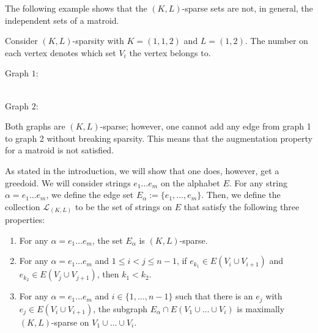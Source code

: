 \documentclass{article}
\begin{document}
The following example shows that the $(K,L)$-sparse sets are not, in general, the independent sets of a matroid. 
\begin{example}
Consider $(K,L)$-sparsity with $K=(1,1,2)$ and $L=(1,2)$. The number on each vertex denotes which set $V_i$ the vertex belongs to.
\begin{center}    
Graph $1$:\\
\\
Graph $2$:\\
\end{center}

Both graphs are $(K,L)$-sparse; however, one cannot add any edge from graph 1 to graph 2 without breaking sparsity. This means that the augmentation property for a matroid is not satisfied.
\end{example}



As stated in the introduction, we will show that one does, however, get a greedoid. We will consider strings $e_1\dots e_m$ on the alphabet $E$. For any string $\alpha=e_1\dots e_m$, we define the edge set $E_\alpha:= \{e_1, \dots, e_m\}$. Then, we define the collection $\mathcal{L}_{(K,L)}$ to be the set of strings on $E$ that satisfy the following three properties:
\begin{enumerate}
\item{For any $\alpha=e_1\dots e_m$, the set $E_\alpha$ is $(K,L)$-sparse}.
\item{For any $\alpha=e_1\dots e_m$ and $1\leq i< j \leq n-1$, if $e_{k_1} \in E(V_i \cup V_{i+1})$ and $e_{k_2} \in  E(V_j \cup V_{j+1})$, then $k_1 < k_2$.}
\item{For any $\alpha=e_1\dots e_m$ and $i\in \{1,\dots, n-1\}$ such that there is an $e_j$ with $e_{j}\in E(V_i\cup V_{i+1})$, the subgraph $E_{\alpha} \cap E(V_1\cup \dots \cup V_i)$ is maximally $(K,L)$-sparse on $V_1\cup \dots \cup V_i$. }
\end{enumerate}
\end{document}
